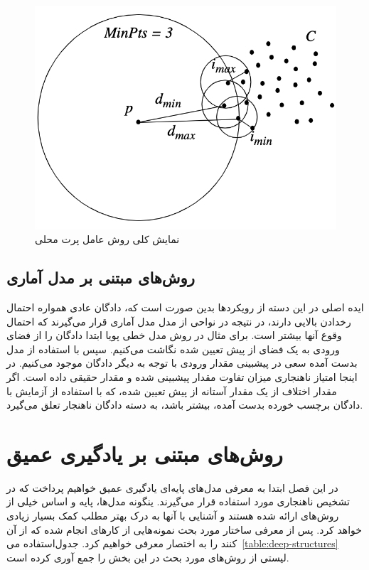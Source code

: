 \documentclass[12pt,a4paper]{report}
\theoremstyle{definition}
\theoremstyle{definition}
\begin{document}
	\begin{figure}[!h]
	\begin{center}
		\includegraphics[width=0.5\linewidth]{./images/figures/lof.png}
	\end{center}
	\caption{نمایش کلی روش عامل پرت محلی~\cite{10.1145/342009.335388}}
	\label{fig:lof}
	\centering
\end{figure}



\section{روش‌های مبتنی بر مدل آماری}
ایده اصلی در این دسته از رویکرد‌ها بدین صورت است که، دادگان عادی همواره احتمال رخدادن بالایی دارند، در نتیجه در نواحی از مدل مدل آماری قرار می‌گیرند که احتمال وقوع آنها بیشتر است. برای مثال در روش مدل خطی پویا ابتدا دادگان را از فضای ورودی به یک فضای از پیش تعیین شده نگاشت می‌کنیم. سپس با استفاده از مدل بدست آمده سعی در پیشبینی مقدار ورودی با توجه به دیگر دادگان موجود می‌کنیم. در اینجا امتیاز ناهنجاری میزان تفاوت مقدار پیشبینی شده و مقدار حقیقی داده است. اگر مقدار اختلاف از یک مقدار آستانه از پیش تعیین شده، که با استفاده از آزمایش با دادگان برچسب خورده بدست آمده، بیشتر باشد، به دسته دادگان ناهنجار تعلق می‌گیرد.


	\chapter{روش‌های مبتنی بر یادگیری عمیق}
	در این فصل‌ ابتدا به معرفی مدل‌های پایه‌ای یادگیری عمیق خواهیم پرداخت که در تشخیص ناهنجاری مورد استفاده قرار می‌گیرند. ینگونه مدل‌ها، پایه و اساس خیلی از روش‌های ارائه شده هستند و آشنایی با آنها به درک بهتر مطلب کمک بسیار زیادی خواهد کرد. پس از معرفی ساختار مورد بحث نمونه‌هایی از کار‌های انجام شده که از آن استفاده می‌‎کنند را به اختصار معرفی خواهیم کرد. جدول~\ref{table:deep-structures} لیستی از روش‌های مورد بحث در این بخش را جمع آوری کرده است.
\end{document}
